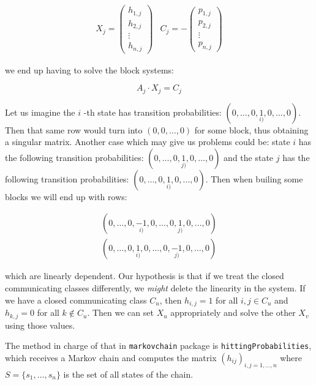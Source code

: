 \documentclass[
  nojss]{jss}
\begin{document}
\begin{equation*}
\begin{array}{lr}
X_j = \left(\begin{array}{c}
h_{1,j} \\
h_{2,j} \\
\vdots  \\
h_{n,j}
\end{array}\right) &
C_j = - \left(\begin{array}{c}
p_{1,j} \\
p_{2,j} \\
\vdots  \\
p_{n,j}
\end{array}\right)
\end{array}
\end{equation*}

we end up having to solve the block systems:

\begin{equation}
A_j \cdot X_j = C_j
\end{equation}

Let us imagine the \(i\) -th state has transition probabilities: \((0, \ldots, 0, \underset{i)}{1}, 0, \ldots, 0)\). Then that same row would turn into \((0,0, \ldots, 0)\) for some block, thus obtaining a singular matrix. Another case which may give us problems could be: state \(i\) has the following transition probabilities: \((0, \ldots, 0, \underset{j)}{1}, 0, \ldots, 0)\) and the state \(j\) has the following transition probabilities: \((0, \ldots, 0, \underset{i)}{1}, 0, \ldots, 0)\). Then when builing some blocks we will end up with rows:

\begin{eqnarray*}
(0, \ldots, 0, \underset{i)}{-1}, 0, \ldots, 0, \underset{j)}{1}, 0, \ldots, 0) \\
(0, \ldots, 0, \underset{i)}{1},  0, \ldots, 0, \underset{j)}{-1}, 0, \ldots, 0)
\end{eqnarray*}

which are linearly dependent. Our hypothesis is that if we treat the closed communicating classes differently, we \emph{might} delete the linearity in the system. If we have a closed communicating class \(C_u\), then \(h_{i,j} = 1\) for all \(i,j \in C_u\) and \(h_{k,j} = 0\) for all \(k\not\in C_u\). Then we can set \(X_u\) appropriately and solve the other \(X_v\) using those values.

The method in charge of that in \texttt{markovchain} package is \texttt{hittingProbabilities}, which receives a Markov chain and computes the matrix \((h_{ij})_{i,j = 1,\ldots, n}\) where \(S = \{s_1, \ldots, s_n\}\) is the set of all states of the chain.
\end{document}
